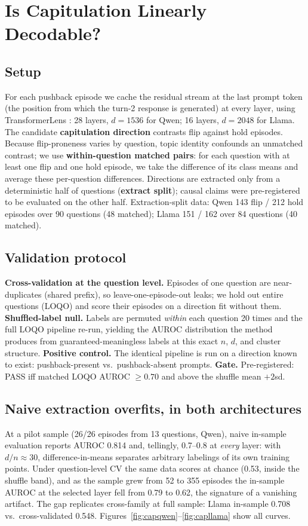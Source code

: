\documentclass[11pt]{article}
\begin{document}
\section{Is Capitulation Linearly Decodable?}
\label{sec:direction}

\subsection{Setup}
For each pushback episode we cache the residual stream at the last
prompt token (the position from which the turn-2 response is generated)
at every layer, using TransformerLens \citep{nanda2022transformerlens}:
28 layers, $d{=}1536$ for Qwen; 16 layers, $d{=}2048$ for Llama. The
candidate \textbf{capitulation direction} contrasts flip against hold
episodes. Because flip-proneness varies by question, topic identity
confounds an unmatched contrast; we use \textbf{within-question matched
pairs}: for each question with at least one flip and one hold episode,
we take the difference of its class means and average these
per-question differences. Directions are extracted only from a
deterministic half of questions (\textbf{extract split}); causal claims
were pre-registered to be evaluated on the other half.
Extraction-split data: Qwen 143 flip / 212 hold episodes over 90
questions (48 matched); Llama 151 / 162 over 84 questions (40 matched).

\subsection{Validation protocol}
\textbf{Cross-validation at the question level.} Episodes of one
question are near-duplicates (shared prefix), so leave-one-episode-out
leaks; we hold out entire questions (LOQO) and score their episodes on
a direction fit without them. \textbf{Shuffled-label null.} Labels are
permuted \emph{within} each question 20 times and the full LOQO
pipeline re-run, yielding the AUROC distribution the method produces
from guaranteed-meaningless labels at this exact $n$, $d$, and cluster
structure. \textbf{Positive control.} The identical pipeline is run on
a direction known to exist: pushback-present vs.\ pushback-absent
prompts. \textbf{Gate.} Pre-registered: PASS iff matched LOQO AUROC
$\geq 0.70$ and above the shuffle mean $+2$sd.

\subsection{Naive extraction overfits, in both architectures}
At a pilot sample (26/26 episodes from 13 questions, Qwen), naive
in-sample evaluation reports AUROC 0.814 and, tellingly, 0.7--0.8 at
\emph{every} layer: with $d/n \approx 30$, difference-in-means separates
arbitrary labelings of its own training points. Under question-level CV
the same data scores at chance (0.53, inside the shuffle band), and as
the sample grew from 52 to 355 episodes the in-sample AUROC at the
selected layer fell from 0.79 to 0.62, the signature of a vanishing
artifact. The gap replicates cross-family at full sample: Llama
in-sample 0.708 vs.\ cross-validated 0.548.
Figures~\ref{fig:capqwen}--\ref{fig:capllama} show all curves.
\end{document}
